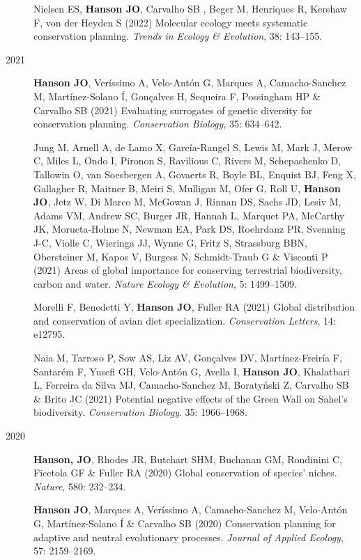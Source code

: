 \documentclass[12pt,a4paper]{article}
\begin{document}
\begin{description}
\item[] Nielsen ES, \textbf{Hanson JO}, Carvalho SB , Beger M, Henriques R, Kershaw F, von der Heyden S (2022) Molecular ecology meets systematic conservation planning. \textit{Trends in Ecology \& Evolution}, 38: 143--155.

\item[2021] \textbf{Hanson JO}, Veríssimo A, Velo-Antón G, Marques A, Camacho-Sanchez M, Martínez-Solano Í, Gonçalves H, Sequeira F, Possingham HP \& Carvalho SB (2021) Evaluating surrogates of genetic diversity for conservation planning. \textit{Conservation Biology}, 35: 634--642.

\item[] Jung M, Arnell A, de Lamo X, García-Rangel S, Lewis M, Mark J, Merow C, Miles L, Ondo I, Pironon S, Ravilious C, Rivers M, Schepashenko D, Tallowin O, van Soesbergen A, Govaerts R, Boyle BL, Enquist BJ, Feng X, Gallagher R, Maitner B, Meiri S, Mulligan M, Ofer G, Roll U, \textbf{Hanson JO}, Jetz W, Di Marco M, McGowan J, Rinnan DS, Sachs JD, Lesiv M, Adams VM, Andrew SC, Burger JR, Hannah L, Marquet PA, McCarthy JK, Morueta-Holme N, Newman EA, Park DS, Roehrdanz PR, Svenning J-C, Violle C, Wieringa JJ, Wynne G, Fritz S, Strassburg BBN, Obersteiner M, Kapos V, Burgess N, Schmidt-Traub G \& Visconti P (2021) Areas of global importance for conserving terrestrial biodiversity, carbon and water. \textit{Nature Ecology \& Evolution}, 5: 1499--1509.

\item[] Morelli F, Benedetti Y, \textbf{Hanson JO}, Fuller RA (2021) Global distribution and conservation of avian diet specialization. \textit{Conservation Letters}, 14: e12795.

\item[] Naia M, Tarroso P, Sow AS, Liz AV, Gonçalves DV, Martínez-Freiría F, Santarém F, Yusefi GH, Velo-Antón G, Avella I, \textbf{Hanson JO}, Khalatbari L, Ferreira da Silva MJ, Camacho-Sanchez M, Boratyński Z, Carvalho SB \& Brito JC (2021) Potential negative effects of the Green Wall on Sahel's biodiversity. \textit{Conservation Biology}. 35: 1966--1968.

\item[2020] \textbf{Hanson, JO}, Rhodes JR, Butchart SHM, Buchanan GM, Rondinini C, Ficetola GF \& Fuller RA (2020) Global conservation of species' niches. \textit{Nature}, 580: 232--234.

\item[] \textbf{Hanson JO}, Marques A, Veríssimo A, Camacho-Sanchez M, Velo-Antón G, Martínez-Solano Í \& Carvalho SB (2020) Conservation planning for adaptive and neutral evolutionary processes. \textit{Journal of Applied Ecology}, 57: 2159--2169.


\end{description}
\end{document}
